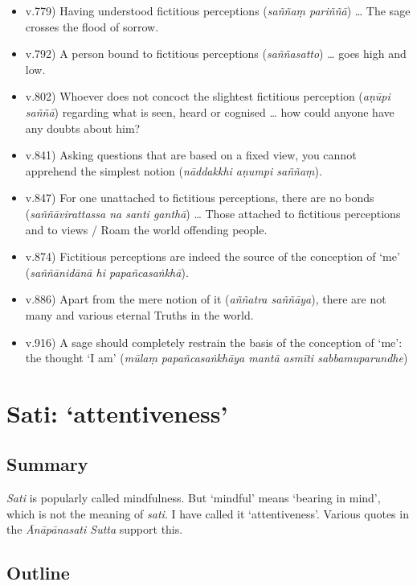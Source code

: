 \begin{itemize}
\item v.779) Having understood fictitious perceptions (\textit{saññaṃ pariññā}) \ldots{} The sage crosses the flood of sorrow.
\item v.792) A person bound to fictitious perceptions (\textit{saññasatto}) \ldots{} goes high and low.
\item v.802) Whoever does not concoct the slightest fictitious perception (\textit{aṇūpi saññā}) regarding what is seen, heard or cognised \ldots{} how could anyone have any doubts about him?
\item v.841) Asking questions that are based on a fixed view, you cannot apprehend the simplest notion (\textit{nāddakkhi aṇumpi saññaṃ}).
\item v.847) For one unattached to fictitious perceptions, there are no bonds (\textit{saññāvirattassa na santi ganthā}) \ldots{} Those attached to fictitious perceptions and to views / Roam the world offending people.
\item v.874) Fictitious perceptions are indeed the source of the conception of `me' (\textit{saññānidānā hi papañcasaṅkhā}).
\item v.886) Apart from the mere notion of it (\textit{aññatra saññāya}), there are not many and various eternal Truths in the world.
\item v.916) A sage should completely restrain the basis of the conception of `me': the thought `I am' (\textit{mūlaṃ papañcasaṅkhāya mantā asmīti sabbamuparundhe})
\end{itemize}

\section*{Sati: `attentiveness'}\label{transl-attentiveness}

\subsection*{Summary}

\textit{Sati} is popularly called mindfulness. But `mindful' means `bearing in mind', which is not the meaning of \textit{sati}. I have called it `attentiveness'. Various quotes in the \textit{Ānāpānasati Sutta} support this.

\subsection*{Outline}

